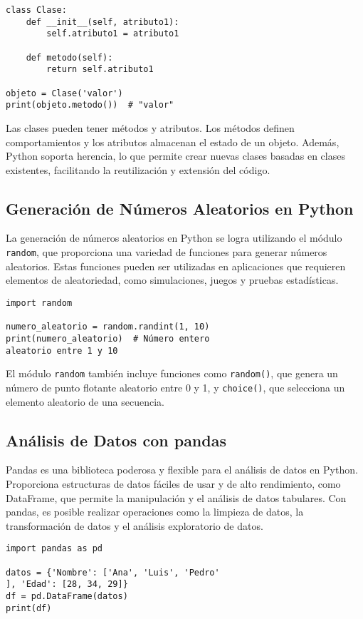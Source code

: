 \documentclass[conference]{IEEEtran}
\begin{document}
\begin{verbatim}
class Clase:
    def __init__(self, atributo1):
        self.atributo1 = atributo1
    
    def metodo(self):
        return self.atributo1

objeto = Clase('valor')
print(objeto.metodo())  # "valor"
\end{verbatim}

Las clases pueden tener métodos y atributos. Los métodos definen comportamientos y los atributos almacenan el estado de un objeto. Además, Python soporta herencia, lo que permite crear nuevas clases basadas en clases existentes, facilitando la reutilización y extensión del código.

\subsection{Generación de Números Aleatorios en Python}
La generación de números aleatorios en Python se logra utilizando el módulo \texttt{random}, que proporciona una variedad de funciones para generar números aleatorios. Estas funciones pueden ser utilizadas en aplicaciones que requieren elementos de aleatoriedad, como simulaciones, juegos y pruebas estadísticas.

\begin{verbatim}
import random

numero_aleatorio = random.randint(1, 10)
print(numero_aleatorio)  # Número entero 
aleatorio entre 1 y 10
\end{verbatim}

El módulo \texttt{random} también incluye funciones como \texttt{random()}, que genera un número de punto flotante aleatorio entre 0 y 1, y \texttt{choice()}, que selecciona un elemento aleatorio de una secuencia.

\subsection{Análisis de Datos con pandas}
Pandas es una biblioteca poderosa y flexible para el análisis de datos en Python. Proporciona estructuras de datos fáciles de usar y de alto rendimiento, como DataFrame, que permite la manipulación y el análisis de datos tabulares. Con pandas, es posible realizar operaciones como la limpieza de datos, la transformación de datos y el análisis exploratorio de datos.

\begin{verbatim}
import pandas as pd

datos = {'Nombre': ['Ana', 'Luis', 'Pedro'
], 'Edad': [28, 34, 29]}
df = pd.DataFrame(datos)
print(df)
\end{verbatim}
\end{document}
